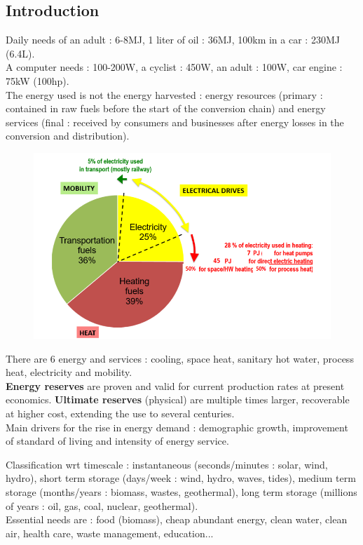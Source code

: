 \documentclass[../main.tex]{subfiles}
\begin{document}
\localtableofcontents

\subsection{Introduction}
Daily needs of an adult : 6-8MJ, 1 liter of oil : 36MJ, 100km in a car : 230MJ (6.4L).\\
A computer needs : 100-200W, a cyclist : 450W, an adult : 100W, car engine : 75kW (100hp).\\

The energy used is not the energy harvested : energy resources (primary : contained in raw fuels before the start of the conversion chain) and energy services (final : received by consumers and businesses after energy losses in the conversion and distribution).\\

\begin{figure}[hbt!]
    \centering
    \includegraphics[width=0.6\linewidth]{IMAGES/Renewable/Screenshot from 2025-02-22 19-57-45.png}
\end{figure}

There are 6 energy and services : cooling, space heat, sanitary hot water, process heat, electricity and mobility. \\
\textbf{Energy reserves} are proven and valid for current production rates at present economics. \textbf{Ultimate reserves} (physical) are multiple times larger, recoverable at higher cost, extending the use to several centuries. \\

Main drivers for the rise in energy demand : demographic growth, improvement of standard of living and intensity of energy service. 

Classification wrt timescale : instantaneous (seconds/minutes : solar, wind, hydro), short term storage (days/week : wind, hydro, waves, tides), medium term storage (months/years : biomass, wastes, geothermal), long term storage (millions of years : oil, gas, coal, nuclear, geothermal).\\
Essential needs are : food (biomass), cheap abundant energy, clean water, clean air, health care, waste management, education...\\
\end{document}
